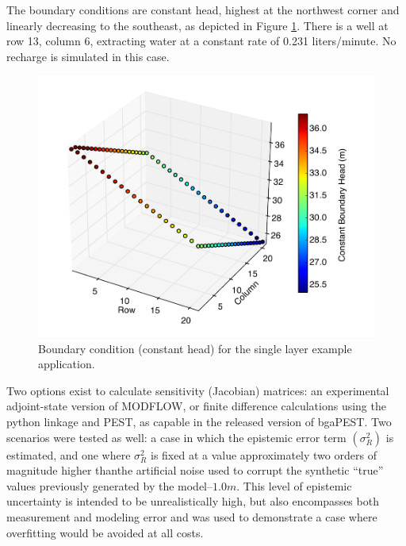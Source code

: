 \documentclass[11pt,oneside,onecolumn]{usgsreport}
\begin{document}
\begin{appendix}
\begin{bibunit}
\begin{figure}[!t]
\end{figure}
The boundary conditions are constant head, highest at the northwest
corner and linearly decreasing to the southeast, as depicted in Figure
\ref{fig:stheads1L}. There is a well at row 13, column 6, extracting
water at a constant rate of 0.231 liters/minute. No recharge is simulated
in this case.

\begin{figure}[!t]
\begin{center}\includegraphics[scale=0.5]{figures/starting_heads}\end{center}

\caption{\label{fig:stheads1L}Boundary condition (constant head) for the single
layer example application.}
\end{figure}


Two options exist to calculate sensitivity (Jacobian) matrices: an
experimental adjoint-state version of MODFLOW, or finite difference
calculations using the python linkage and PEST, as capable in the
released version of bgaPEST. Two scenarios were tested as well: a
case in which the epistemic error term $\left(\sigma_{R}^{2}\right)$
is estimated, and one where $\sigma_{R}^{2}$ is fixed at a value
approximately two orders of magnitude higher thanthe artificial noise
used to corrupt the synthetic ``true'' values previously generated
by the model--$1.0m$. This level of epistemic uncertainty is intended
to be unrealistically high, but also encompasses both measurement
and modeling error and was used to demonstrate a case where overfitting
would be avoided at all costs.


\end{bibunit}
\end{appendix}
\end{document}
